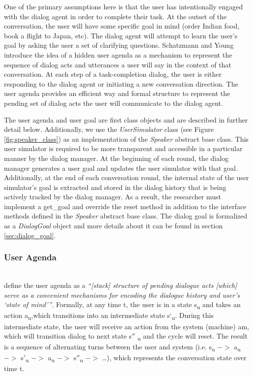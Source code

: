 One of the primary assumptions here is that the user has intentionally engaged with the dialog agent in order to complete their task. At the outset of the conversation, the user will have some specific goal in mind (order Indian food, book a flight to Japan, etc). The dialog agent will attempt to learn the user's goal by asking the user a set of clarifying questions. Schatzmann and Young introduce the idea of a hidden user agenda as a mechanism to represent the sequence of dialog acts and utterances a user will say in the context of that conversation. At each step of a task-completion dialog, the user is either responding to the dialog agent or initiating a new conversation direction. The user agenda provides an efficient way and formal structure to represent the pending set of dialog acts the user will communicate to the dialog agent.

The user agenda and user goal are first class objects and are described in further detail below. Additionally, we use the \textit{UserSimulator} class (see Figure \ref{fig:speaker_class}) as an implementation of the \textit{Speaker} abstract base class. This user simulator is required to be more transparent and accessible in a particular manner by the dialog manager. At the beginning of each round, the dialog manager generates a user goal and updates the user simulator with that goal. Additionally, at the end of each conversation round, the internal state of the user simulator's goal is extracted and stored in the dialog history that is being actively tracked by the dialog manager. As a result, the researcher must implement a get\_goal and override the reset method in addition to the interface methods defined in the \textit{Speaker} abstract base class. The dialog goal is formalized as a \textit{DialogGoal} object and more details about it can be found in section \ref{sec:dialog_goal}. 

\subsubsection{User Agenda} 
~ \\
\cite{Schatzmann2009TheHA} define the user agenda as a \textit{“[stack] structure of pending dialogue acts [which] serve as a convenient mechanisms for encoding the dialogue history and user’s ‘state of mind’”}. Formally, at any time t, the user is in a state s\textsubscript{u} and takes an action a\textsubscript{u},which transitions into an intermediate state s\lq\textsubscript{u}. During this intermediate state, the user will receive an action from the system (machine) am, which will transition dialog to next state s$''$ \textsubscript{u} and the cycle will reset. The result is a sequence of alternating turns between the user and system (i.e. s\textsubscript{u} $->$ a\textsubscript{u} $->$ s$'$\textsubscript{u} $->$ a\textsubscript{u} $->$ s$''$\textsubscript{u} $->$ \dots), which represents the conversation state over time t.

